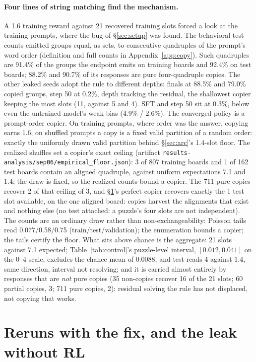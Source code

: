 \documentclass{article}
\begin{document}
\paragraph{Four lines of string matching find the mechanism.} A 1.6
training reward against 21 recovered training slots forced a look at the
training prompts, where the bug of \S\ref{sec:setup} was found. The behavioral test counts emitted groups
equal, as sets, to consecutive quadruples of the prompt's word order
(definition and full counts in Appendix~\ref{app:copy}). Such quadruples are 91.4\% of the groups the endpoint emits on training boards and 92.4\% on test boards; 88.2\% and 90.7\% of its responses are pure four-quadruple copies. The other leaked seeds adopt the rule to different depths: finals at 88.5\% and 79.0\% copied groups, step 50 at 0.2\%, depth tracking the residual, the shallowest copier keeping the most slots (11, against 5 and 4). SFT and
step 50 sit at 0.3\%, below even the untrained model's weak bias
(4.9\% / 2.6\%). The converged policy is a prompt-order copier. On training
prompts, where order was the answer, copying earns 1.6; on shuffled prompts
a copy is a fixed valid partition of a random order: exactly the uniformly drawn valid partition behind \S\ref{sec:arc}'s 1.4-slot floor. The realized shuffles set a copier's exact ceiling (artifact \texttt{results-analysis/sep06/empirical\_floor.json}): 3 of 807 training boards and 1 of 162 test boards contain an aligned quadruple, against uniform expectations 7.1 and 1.4; the draw is fixed, so the realized counts bound a copier. The 711 pure copies recover 2 of that ceiling of 3, and \S\ref{sec:leakfree}'s perfect copier recovers exactly the 1 test slot available, on the one aligned board: copies harvest the alignments that exist and nothing else (no test attached: a puzzle's four slots are not independent). The counts are an ordinary draw rather than non-exchangeability: Poisson tails read 0.077/0.58/0.75 (train/test/validation); the enumeration bounds a copier; the tails certify the floor. What sits above chance is the aggregate: 21 slots against 7.1 expected; Table~\ref{tab:control}'s puzzle-level interval, $[0.012, 0.041]$ on the 0--4 scale, excludes the chance mean of 0.0088, and test reads 4 against 1.4, same direction, interval not resolving; and it is carried almost entirely by responses that are \emph{not} pure copies (35 non-copies recover 16 of the 21 slots; 60 partial copies, 3; 711 pure copies, 2): residual solving the rule has not displaced, not copying that works.

\section{Reruns with the fix, and the leak without RL}
\label{sec:leakfree}
\end{document}
